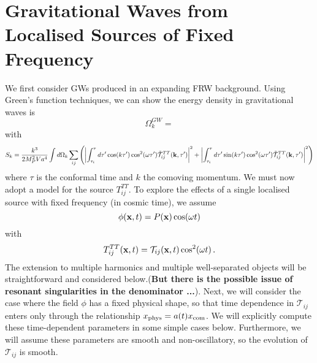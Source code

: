 \documentclass{revtex4}
\begin{document}
\section{Gravitational Waves from Localised Sources of Fixed Frequency}
We first consider GWs produced in an expanding FRW background.
Using Green's function techniques, we can show the energy density in gravitational waves is
\begin{equation}
  \Omega_k^{GW} = 
\end{equation}
with
\begin{equation}
  S_k = \frac{k^3}{2M_P^2Va^4}\int d\Omega_k\sum_{ij}\left(\left|\int_{\tau_i}^\tau d\tau'\cos(k\tau')\cos^2(\omega \tau')\tilde{\mathcal{T}}^{TT}_{ij}({\bf k},\tau')\right|^2 + \left|\int_{\tau_i}^\tau d\tau'\sin(k\tau')\cos^2(\omega \tau')\tilde{\mathcal{T}}^{TT}_{ij}({\bf k},\tau')\right|^2 \right)
\end{equation}
where $\tau$ is the conformal time and $k$ the comoving momentum.
We must now adopt a model for the source $T^{TT}_{ij}$.
To explore the effects of a single localised source with fixed frequency (in cosmic time), we assume
\begin{equation}
  \phi({\bf x},t) = P({\bf x})\cos(\omega t)
\end{equation}
with
\begin{equation}
  T^{TT}_{ij}({\bf x},t) = \mathcal{T}_{ij}({\bf x},t)\cos^2(\omega t) \, .
\end{equation}
The extension to multiple harmonics and multiple well-separated objects will be straightforward and considered below.({\bf But there is the possible issue of resonant singularities in the denominator ...}).
Next, we will consider the case where the field $\phi$ has a fixed physical shape, so that time dependence in $\mathcal{T}_{ij}$ enters only through the relationship $x_{\rm phys} = a(t)x_{\rm com}$.
We will explicitly compute these time-dependent parameters in some simple cases below.
Furthermore, we will assume these parameters are smooth and non-oscillatory, so the evolution of $\mathcal{T}_{ij}$ is smooth.
\end{document}
